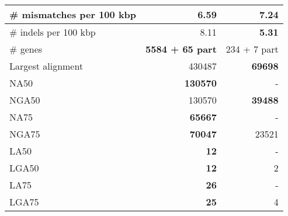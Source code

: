 \documentclass[12pt,a4paper]{article}
\begin{document}
\begin{table}[ht]
\begin{center}
\begin{tabular}{|l*{2}{|r}|}
\# mismatches per 100 kbp & {\bf 6.59} & 7.24 \\ \hline
\# indels per 100 kbp & 8.11 & {\bf 5.31} \\ \hline
\# genes & {\bf 5584 + 65 part} & 234 + 7 part \\ \hline
Largest alignment & 430487 & {\bf 69698} \\ \hline
NA50 & {\bf 130570} & - \\ \hline
NGA50 & 130570 & {\bf 39488} \\ \hline
NA75 & {\bf 65667} & - \\ \hline
NGA75 & {\bf 70047} & 23521 \\ \hline
LA50 & {\bf 12} & - \\ \hline
LGA50 & {\bf 12} & 2 \\ \hline
LA75 & {\bf 26} & - \\ \hline
LGA75 & {\bf 25} & 4 \\ \hline
\end{tabular}
\end{center}
\end{table}
\end{document}
